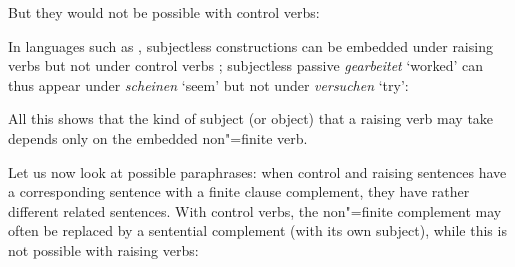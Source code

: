 \noindent
But they would not be possible with control verbs:
\eal
{}
\zl

In languages such as , subjectless constructions can be embedded under
raising verbs but not under control verbs \citep[]{Mueller2002b}; subjectless passive
\emph{gearbeitet} `worked' can thus appear under \emph{scheinen} `seem' but not under
\emph{versuchen} `try': 

\eal
\label{german1}\label{ex-raising-with-subjectless-verbs}
\zl
 
\largerpage[2]
\noindent
All this shows that the kind of subject (or object) that a raising verb may take depends only on the embedded
non"=finite verb.

Let us now look at possible paraphrases: when control and raising sentences have a corresponding sentence with a finite clause complement, they have rather different related sentences.
With control verbs, the non"=finite complement may often be replaced by a sentential complement (with its own subject), while this is not possible with raising verbs:

\eal
{}
\zl

\eal
{}
\zl

